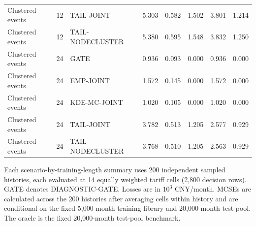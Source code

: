 \begin{table}[tbp]
{\begin{tabular}{@{}llllllll@{}}
Clustered events & 12 & TAIL-JOINT & 5.303 & 0.582 & 1.502 & 3.801 & 1.214\\
Clustered events & 12 & TAIL-NODECLUSTER & 5.380 & 0.595 & 1.548 & 3.832 & 1.250\\
Clustered events & 24 & GATE & 0.936 & 0.093 & 0.000 & 0.936 & 0.000\\
Clustered events & 24 & EMP-JOINT & 1.572 & 0.145 & 0.000 & 1.572 & 0.000\\
Clustered events & 24 & KDE-MC-JOINT & 1.020 & 0.105 & 0.000 & 1.020 & 0.000\\
Clustered events & 24 & TAIL-JOINT & 3.782 & 0.513 & 1.205 & 2.577 & 0.929\\
Clustered events & 24 & TAIL-NODECLUSTER & 3.768 & 0.510 & 1.205 & 2.563 & 0.929\\
\bottomrule
\end{tabular}}
\par\smallskip\noindent\begin{minipage}{\linewidth}\footnotesize Each scenario-by-training-length summary uses 200 independent sampled histories, each evaluated at 14 equally weighted tariff cells (2,800 decision rows). GATE denotes DIAGNOSTIC-GATE. Losses are in $10^3$ CNY/month. MCSEs are calculated across the 200 histories after averaging cells within history and are conditional on the fixed 5,000-month training library and 20,000-month test pool. The oracle is the fixed 20,000-month test-pool benchmark.\end{minipage}
\end{table}
\endgroup
